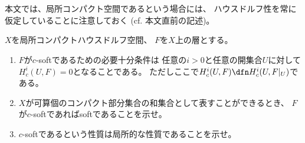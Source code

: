 \documentclass[uplatex,dvipdfmx]{jsarticle}
\begin{document}
\maketitle
\HeaderCommentA
\section{}

本文では、局所コンパクト空間であるという場合には、
ハウスドルフ性を常に仮定していることに注意しておく
(cf. 本文\cite[Proposition 2.5.1]{kashiwara2002sheaves}直前の記述)。
\fi


\begin{prob}\label{2.6}
  \(X\)を局所コンパクトハウスドルフ空間、
  \(F\)を\(X\)上の層とする。
  \begin{enumerate}
    \item \label{2.6.1}
    \(F\)が\(c\)-softであるための必要十分条件は
    任意の\(i>0\)と任意の開集合\(U\)に対して
    \(H^i_c(U,F) = 0\)となることである。
    ただしここで\(H^i_c(U,F)\dfn H^i_c(U,F|_U)\)である。
    \item \label{2.6.2}
    \(X\)が可算個のコンパクト部分集合の和集合として表すことができるとき、
    \(F\)が\(c\)-softであればsoftであることを示せ。
    \item \label{2.6.3}
    \(c\)-softであるという性質は局所的な性質であることを示せ。
  \end{enumerate}
\end{prob}
\end{document}
